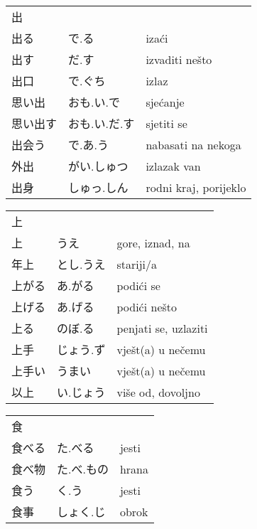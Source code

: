 

\newenvironment{dictentry}[1]{
	\begin{tabular}{p{2cm} p{3cm} p{10cm}}
		#1 &&\\
}{
	\end{tabular}
	\vspace{20pt}
}

\newcommand{\example}[3]{
	\hspace*{\fill}#1 & #2 & #3\\
}

\author{ロボット君}


\begin{dictentry}{出}
\example{出る}{で.る}{izaći}
\example{出す}{だ.す}{izvaditi nešto}
\example{出口}{で.ぐち}{izlaz}
\example{思い出}{おも.い.で}{sjećanje}
\example{思い出す}{おも.い.だ.す}{sjetiti se}
\example{出会う}{で.あ.う}{nabasati na nekoga}
\example{外出}{がい.しゅつ}{izlazak van}
\example{出身}{しゅっ.しん}{rodni kraj, porijeklo}
\end{dictentry}

\begin{dictentry}{上}
\example{上}{うえ}{gore, iznad, na}
\example{年上}{とし.うえ}{stariji/a}
\example{上がる}{あ.がる}{podići se}
\example{上げる}{あ.げる}{podići nešto}
\example{上る}{のぼ.る}{penjati se, uzlaziti}
\example{上手}{じょう.ず}{vješt(a) u nečemu}
\example{上手い}{うまい\footnotemark[1]}{vješt(a) u nečemu}
\example{以上}{い.じょう}{više od, dovoljno}
\end{dictentry}

\begin{dictentry}{食}
\example{食べる}{た.べる}{jesti}
\example{食べ物}{た.べ.もの}{hrana}
\example{食う}{く.う}{jesti}
\example{食事}{しょく.じ}{obrok}
\end{dictentry}


